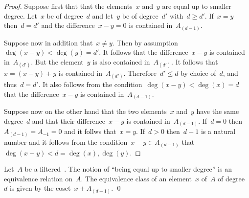 \begin{proof}
  Suppose first that that the elements~$x$ and~$y$ are equal up to smaller degree.
  Let~$x$ be of degree~$d$ and let~$y$ be of degree~$d'$ with~$d \geq d'$.
  If~$x = y$ then~$d = d'$ and the difference~$x - y = 0$ is contained in~$A_{(d-1)}$.

  Suppose now in addition that~$x \neq y$.
  Then by assumption~$\deg(x - y) < \deg(y) = d'$.
  It follows that the difference~$x - y$ is contained in~$A_{(d')}$.
  But the element~$y$ is also contained in~$A_{(d')}$.
  It follows that~$x = (x-y) + y$ is contained in~$A_{(d')}$.
  Therefore~$d' \leq d$ by choice of~$d$, and thus~$d = d'$.
  It also follows from the condition~$\deg(x-y) < \deg(x) = d$ that the difference~$x-y$ is contained in~$A_{(d-1)}$.
 
  Suppose now on the other hand that the two elements~$x$ and~$y$ have the same degree~$d$ and that their difference~$x - y$ is contained in~$A_{(d-1)}$.
  If~$d = 0$ then~$A_{(d-1)} = A_{-1} = 0$ and it follws that~$x = y$.
  If~$d > 0$ then~$d-1$ is a natural number and it follows from the condition~$x - y \in A_{(d-1)}$ that~$\deg(x-y) < d = \deg(x), \deg(y)$.
\end{proof}


\begin{corollary}
  Let~$A$ be a filtered~\algebra{$\kf$}.
  The notion of \enquote{being equal up to smaller degree} is an equivalence relation on~$A$.
  The equivalence class of an element~$x$ of~$A$ of degree~$d$ is given by the coset~$x + A_{(d-1)}$.
  \qed
\end{corollary}


